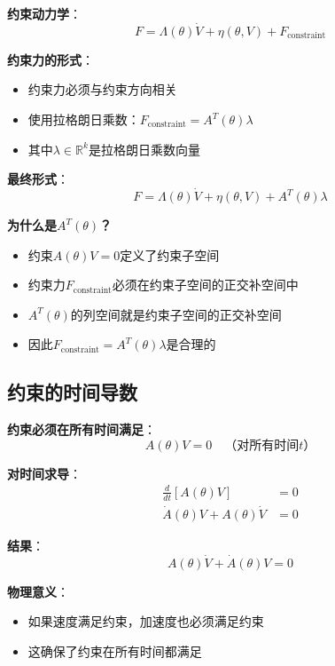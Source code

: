 \documentclass[12pt,a4paper]{article}
\begin{document}
\textbf{约束动力学}：
\begin{equation}
F = \Lambda(\theta)\dot{V} + \eta(\theta, V) + F_{\text{constraint}} \tag{11.56}
\end{equation}

\textbf{约束力的形式}：
\begin{itemize}
\item 约束力必须与约束方向相关
\item 使用拉格朗日乘数：$F_{\text{constraint}} = A^T(\theta)\lambda$
\item 其中$\lambda \in \mathbb{R}^k$是拉格朗日乘数向量
\end{itemize}

\textbf{最终形式}：
\begin{equation}
F = \Lambda(\theta)\dot{V} + \eta(\theta, V) + A^T(\theta)\lambda \tag{11.56}
\end{equation}

\textbf{为什么是$A^T(\theta)$？}
\begin{itemize}
\item 约束$A(\theta)V = 0$定义了约束子空间
\item 约束力$F_{\text{constraint}}$必须在约束子空间的正交补空间中
\item $A^T(\theta)$的列空间就是约束子空间的正交补空间
\item 因此$F_{\text{constraint}} = A^T(\theta)\lambda$是合理的
\end{itemize}

\subsection{约束的时间导数}

\textbf{约束必须在所有时间满足}：
\begin{equation}
A(\theta)V = 0 \quad \text{（对所有时间$t$）}
\end{equation}

\textbf{对时间求导}：
\begin{align}
\frac{d}{dt}[A(\theta)V] &= 0 \\
\dot{A}(\theta)V + A(\theta)\dot{V} &= 0
\end{align}

\textbf{结果}：
\begin{equation}
A(\theta)\dot{V} + \dot{A}(\theta)V = 0 \tag{11.57}
\end{equation}

\textbf{物理意义}：
\begin{itemize}
\item 如果速度满足约束，加速度也必须满足约束
\item 这确保了约束在所有时间都满足
\end{itemize}
\end{document}
